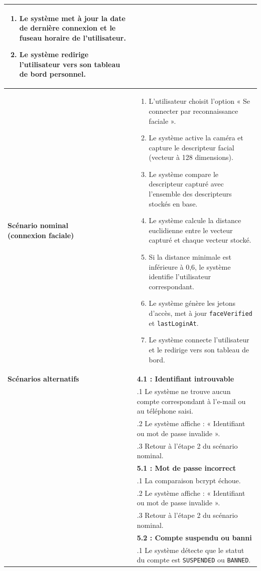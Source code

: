 \documentclass[12pt,a4paper]{report}
\begin{document}
\begin{center}
\begin{longtable}{|L{4cm}|L{11.5cm}|}
\begin{enumerate}
  \item Le système met à jour la date de dernière connexion et le fuseau horaire de l'utilisateur.
  \item Le système redirige l'utilisateur vers son tableau de bord personnel.
\end{enumerate} \\
\hline
\textbf{Scénario nominal \newline (connexion faciale)} &
\begin{enumerate}
  \item L'utilisateur choisit l'option « Se connecter par reconnaissance faciale ».
  \item Le système active la caméra et capture le descripteur facial (vecteur à 128 dimensions).
  \item Le système compare le descripteur capturé avec l'ensemble des descripteurs stockés en base.
  \item Le système calcule la distance euclidienne entre le vecteur capturé et chaque vecteur stocké.
  \item Si la distance minimale est inférieure à 0,6, le système identifie l'utilisateur correspondant.
  \item Le système génère les jetons d'accès, met à jour \texttt{faceVerified} et \texttt{lastLoginAt}.
  \item Le système connecte l'utilisateur et le redirige vers son tableau de bord.
\end{enumerate} \\
\hline
\textbf{Scénarios alternatifs} &
\textbf{4.1 : Identifiant introuvable} \\
& .1 Le système ne trouve aucun compte correspondant à l'e-mail ou au téléphone saisi. \\
& .2 Le système affiche : « Identifiant ou mot de passe invalide ». \\
& .3 Retour à l'étape 2 du scénario nominal. \\[4pt]
& \textbf{5.1 : Mot de passe incorrect} \\
& .1 La comparaison bcrypt échoue. \\
& .2 Le système affiche : « Identifiant ou mot de passe invalide ». \\
& .3 Retour à l'étape 2 du scénario nominal. \\[4pt]
& \textbf{5.2 : Compte suspendu ou banni} \\
& .1 Le système détecte que le statut du compte est \texttt{SUSPENDED} ou \texttt{BANNED}. \\

\end{longtable}
\end{center}
\end{document}
